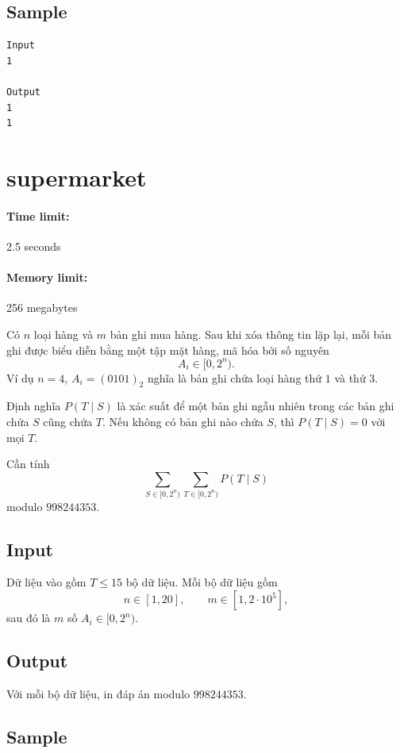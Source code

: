 \documentclass[11pt]{article}
\begin{document}
\subsection*{Sample}

\begin{verbatim}
Input
1

Output
1
1
\end{verbatim}

\section{supermarket}

\paragraph{Time limit:} 2.5 seconds
\paragraph{Memory limit:} 256 megabytes

Có \(n\) loại hàng và \(m\) bản ghi mua hàng. Sau khi xóa thông tin lặp lại,
mỗi bản ghi được biểu diễn bằng một tập mặt hàng, mã hóa bởi số nguyên
\[
  A_i\in[0,2^n).
\]
Ví dụ \(n=4\), \(A_i=(0101)_2\) nghĩa là bản ghi chứa loại hàng thứ \(1\) và
thứ \(3\).

Định nghĩa \(P(T\mid S)\) là xác suất để một bản ghi ngẫu nhiên trong các bản
ghi chứa \(S\) cũng chứa \(T\). Nếu không có bản ghi nào chứa \(S\), thì
\(P(T\mid S)=0\) với mọi \(T\).

Cần tính
\[
  \sum_{S\in[0,2^n)}\sum_{T\in[0,2^n)} P(T\mid S)
\]
modulo \(998244353\).

\subsection*{Input}

Dữ liệu vào gồm \(T\le 15\) bộ dữ liệu. Mỗi bộ dữ liệu gồm
\[
  n\in[1,20],\qquad m\in[1,2\cdot10^5],
\]
sau đó là \(m\) số \(A_i\in[0,2^n)\).

\subsection*{Output}

Với mỗi bộ dữ liệu, in đáp án modulo \(998244353\).

\subsection*{Sample}
\end{document}
